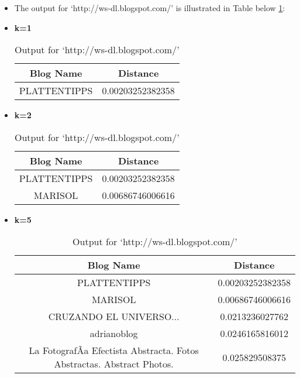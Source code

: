 \begin{itemize}
\item The output for `http://ws-dl.blogspot.com/' is illustrated in Table below \ref{q1table2}:
\item \textbf{ k=1}
\begin{table}
\caption{Output for `http://ws-dl.blogspot.com/'}
\label{q1table2}
\begin{center}
\hspace{-2cm}
\begin{tabular}{|c|c|}
\hline
 \textbf{Blog Name} & \textbf{Distance}\\ \hline
PLATTENTIPPS   & 0.00203252382358	 \\ \hline
\end{tabular}
\end{center}
\end{table}

\item \textbf{ k=2}
\begin{table}
\caption{Output for `http://ws-dl.blogspot.com/'}
\begin{center}
\hspace{-2cm}
\begin{tabular}{|c|c|}
\hline
 \textbf{Blog Name} & \textbf{Distance}\\ \hline
PLATTENTIPPS   & 0.00203252382358	 \\ \hline
MARISOL & 0.00686746006616	  \\ \hline
\end{tabular}
\end{center}
\end{table}

\item \textbf{ k=5}
\begin{table}
\caption{Output for `http://ws-dl.blogspot.com/'}
\begin{center}
\hspace{-2cm}
\begin{tabular}{|c|c|}
\hline
 \textbf{Blog Name} & \textbf{Distance}\\ \hline
PLATTENTIPPS   & 0.00203252382358	 \\ \hline
MARISOL & 0.00686746006616	  \\ \hline
CRUZANDO EL UNIVERSO... &0.0213236027762	  \\ \hline
adrianoblog  &   0.0246165816012	  \\ \hline
La FotografÃ­a Efectista Abstracta. Fotos Abstractas. Abstract  Photos.& 0.025829508375	  \\ \hline
\end{tabular}
\end{center}
\end{table}


\end{itemize}

